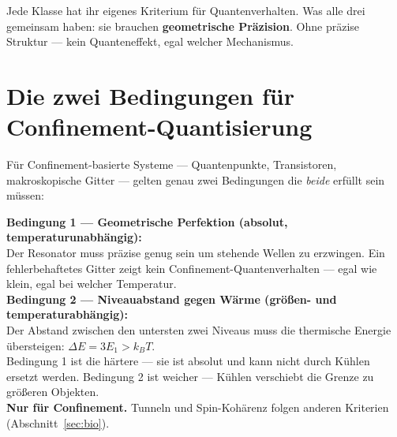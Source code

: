 \begin{center}
\end{center}

Jede Klasse hat ihr eigenes Kriterium für Quantenverhalten.
Was alle drei gemeinsam haben: sie brauchen \textbf{geometrische
Präzision}. Ohne präzise Struktur --- kein Quanteneffekt,
egal welcher Mechanismus.

\section{Die zwei Bedingungen für Confinement-Quantisierung}
\label{sec:zwei-bedingungen}

Für Confinement-basierte Systeme --- Quantenpunkte, Transistoren,
makroskopische Gitter --- gelten genau zwei Bedingungen
die \emph{beide} erfüllt sein müssen:

\begin{important}
\textbf{Bedingung 1 --- Geometrische Perfektion (absolut, temperaturunabhängig):}\\
Der Resonator muss präzise genug sein um stehende Wellen zu erzwingen.
Ein fehlerbehaftetes Gitter zeigt kein Confinement-Quantenverhalten ---
egal wie klein, egal bei welcher Temperatur.\\[6pt]
\textbf{Bedingung 2 --- Niveauabstand gegen Wärme (größen- und temperaturabhängig):}\\
Der Abstand zwischen den untersten zwei Niveaus muss die
thermische Energie übersteigen: $\Delta E = 3E_1 > k_BT$.\\[6pt]
Bedingung 1 ist die härtere --- sie ist absolut und kann nicht
durch Kühlen ersetzt werden. Bedingung 2 ist weicher ---
Kühlen verschiebt die Grenze zu größeren Objekten.\\[4pt]
\textbf{Nur für Confinement.} Tunneln und Spin-Kohärenz
folgen anderen Kriterien (Abschnitt~\ref{sec:bio}).
\end{important}

